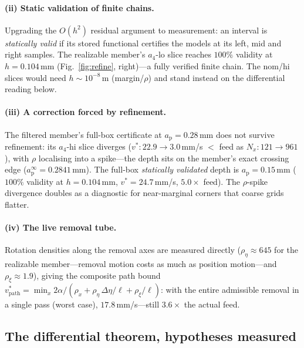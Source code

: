 \documentclass[preprint,12pt]{elsarticle}
\newcommand{\ap}{a_{\mathrm{p}}}
\begin{document}
\paragraph{(ii) Static validation of finite chains.}
Upgrading the $O(h^2)$ residual argument to measurement: an interval is
\emph{statically valid} if its stored functional certifies the models
at its left, mid and right samples.  The realizable member's $a_4$-lo
slice reaches $100\%$ validity at $h = 0.104$\,mm
(Fig.~\ref{fig:refine}, right)---a fully verified finite chain.  The
nom/hi slices would need $h \sim 10^{-8}$\,m (margin/$\rho$) and stand
instead on the differential reading below.

\paragraph{(iii) A correction forced by refinement.}
The filtered member's full-box certificate at $\ap = 0.28$\,mm does
not survive refinement: its $a_4$-hi slice diverges
($v^{*}: 22.9 \to 3.0$\,mm/s $<$ feed as $N_x: 121 \to 961$), with
$\rho$ localising into a spike---the depth sits on the member's exact
crossing edge ($\ap^{\infty} = 0.2841$\,mm).  The full-box
\emph{statically validated} depth is $\ap = 0.15$\,mm
($100\%$ validity at $h = 0.104$\,mm, $v^{*} = 24.7$\,mm/s,
$5.0\times$ feed).  The $\rho$-spike divergence doubles as a
diagnostic for near-marginal corners that coarse grids flatter.

\paragraph{(iv) The live removal tube.}
Rotation densities along the removal axes are measured directly
($\rho_\eta \approx 645$ for the realizable member---removal motion
costs as much as position motion---and $\rho_\xi \approx 1.9$), giving
the composite path bound
$v^{*}_{\mathrm{path}} = \min_x 2\alpha / (\rho_x + \rho_\eta\,
\Delta\eta / \ell + \rho_\xi / \ell)$: with the entire admissible
removal in a single pass (worst case), $17.8$\,mm/s---still
$3.6\times$ the actual feed.

\subsection{The differential theorem, hypotheses measured}
\end{document}

